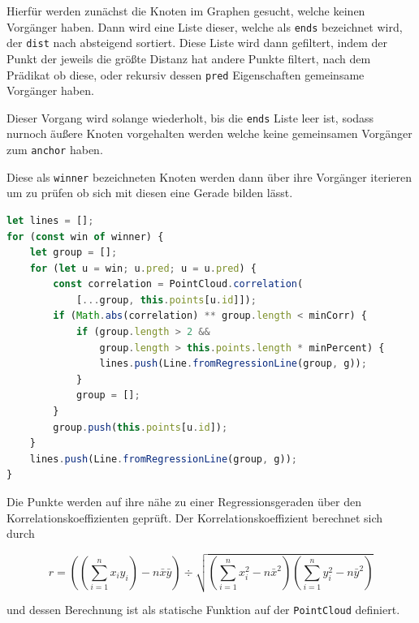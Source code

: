 Hierfür werden zunächst die Knoten im Graphen gesucht, welche keinen Vorgänger haben.
Dann wird eine Liste dieser, welche als \lstinline{ends} bezeichnet wird, der \lstinline{dist} nach absteigend sortiert.
Diese Liste wird dann gefiltert, indem der Punkt der jeweils die grö{\ss}te Distanz hat andere Punkte filtert, nach dem Prädikat ob diese, oder rekursiv dessen \lstinline{pred} Eigenschaften gemeinsame Vorgänger haben.

Dieser Vorgang wird solange wiederholt, bis die \lstinline{ends} Liste leer ist, sodass nurnoch äu{\ss}ere Knoten vorgehalten werden welche keine gemeinsamen Vorgänger zum \lstinline{anchor} haben.

Diese als \lstinline{winner} bezeichneten Knoten werden dann über ihre Vorgänger iterieren um zu prüfen ob sich mit diesen eine Gerade bilden lässt.

\begin{lstlisting}[language=JavaScript, caption={Bestimmung der äu{\ss}ersten Knoten zur Bestimmung von Geraden durch den Korrelationskoeffizienten in der \lstinline{groupsByCorrelation} Funktion innerhalb der \lstinline{Dijkstra} Klasse.}, label={lst:dijkstra_correlation_part2}]
let lines = [];
for (const win of winner) {
    let group = [];
    for (let u = win; u.pred; u = u.pred) {
        const correlation = PointCloud.correlation(
            [...group, this.points[u.id]]);
        if (Math.abs(correlation) ** group.length < minCorr) {
            if (group.length > 2 &&
                group.length > this.points.length * minPercent) {
                lines.push(Line.fromRegressionLine(group, g));
            }
            group = [];
        }
        group.push(this.points[u.id]);
    }
    lines.push(Line.fromRegressionLine(group, g));
}
\end{lstlisting}

Die Punkte werden auf ihre nähe zu einer Regressionsgeraden über den Korrelationskoeffizienten geprüft.
Der Korrelationskoeffizient berechnet sich durch~\cite{Papula2014}

\begin{equation}
    r = \left(\left(\sum_{i=1}^n x_i y_i\right) - n \bar{x} \bar{y}\right) \div \sqrt{\left(\sum_{i=1}^n x_i^2 - n\bar{x}^2\right)\left(\sum_{i=1}^n y_i^2 - n \bar{y}^2\right)}
    \label{eq:korrelationskoeffizient}
\end{equation}

und dessen Berechnung ist als statische Funktion auf der \lstinline{PointCloud} definiert.

